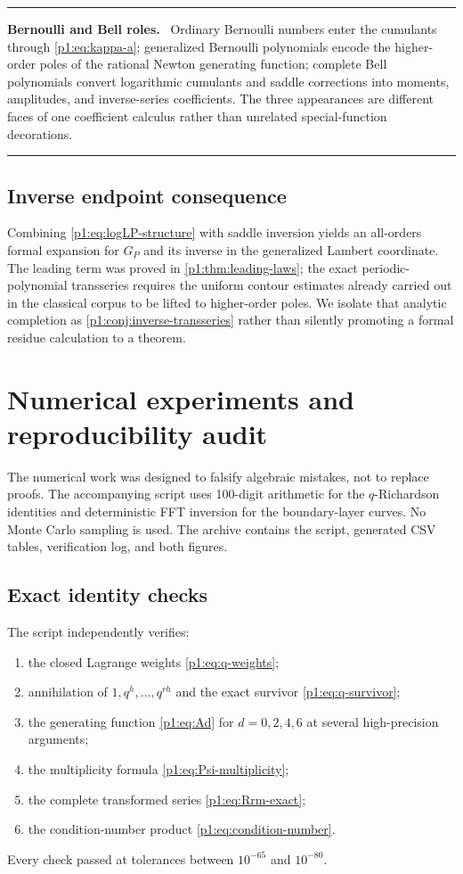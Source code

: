 \documentclass[11pt,oneside]{article}
\numberwithin{equation}{section}
\theoremstyle{definition}
\theoremstyle{remark}
\newenvironment{statusbox}[1]{%
  \par\medskip\noindent\begin{center}\begin{minipage}{0.94\textwidth}%
  \color{linkblue}\hrule\vspace{0.65em}%
  \color{black}\textbf{\color{linkblue}#1.}\ }{%
  \par\vspace{0.65em}\color{linkblue}\hrule
  \end{minipage}\end{center}\medskip}
\begin{document}
\begin{statusbox}{Bernoulli and Bell roles}
Ordinary Bernoulli numbers enter the cumulants through \eqref{p1:eq:kappa-a}; generalized
Bernoulli polynomials encode the higher-order poles of the rational Newton generating
function; complete Bell polynomials convert logarithmic cumulants and saddle corrections into
moments, amplitudes, and inverse-series coefficients.  The three appearances are different
faces of one coefficient calculus rather than unrelated special-function decorations.
\end{statusbox}

\subsection{Inverse endpoint consequence}

Combining \eqref{p1:eq:logLP-structure} with saddle inversion yields an all-orders formal
expansion for $G_P$ and its inverse in the generalized Lambert coordinate.  The leading term
was proved in \cref{p1:thm:leading-laws}; the exact periodic-polynomial transseries requires the
uniform contour estimates already carried out in the classical corpus to be lifted to
higher-order poles.  We isolate that analytic completion as \cref{p1:conj:inverse-transseries}
rather than silently promoting a formal residue calculation to a theorem.


\section{Numerical experiments and reproducibility audit}
\label{p1:sec:numerics}

The numerical work was designed to falsify algebraic mistakes, not to replace proofs.  The
accompanying script  uses 100-digit arithmetic for the
$q$-Richardson identities and deterministic FFT inversion for the boundary-layer curves.
No Monte Carlo sampling is used.  The archive contains the script, generated CSV tables,
verification log, and both figures.

\subsection{Exact identity checks}

The script independently verifies:
\begin{enumerate}
\item the closed Lagrange weights \eqref{p1:eq:q-weights};
\item annihilation of $1,q^h,\ldots,q^{rh}$ and the exact survivor
      \eqref{p1:eq:q-survivor};
\item the generating function \eqref{p1:eq:Ad} for $d=0,2,4,6$ at several high-precision
      arguments;
\item the multiplicity formula \eqref{p1:eq:Psi-multiplicity};
\item the complete transformed series \eqref{p1:eq:Rrm-exact};
\item the condition-number product \eqref{p1:eq:condition-number}.
\end{enumerate}
Every check passed at tolerances between $10^{-65}$ and $10^{-80}$.
\end{document}
